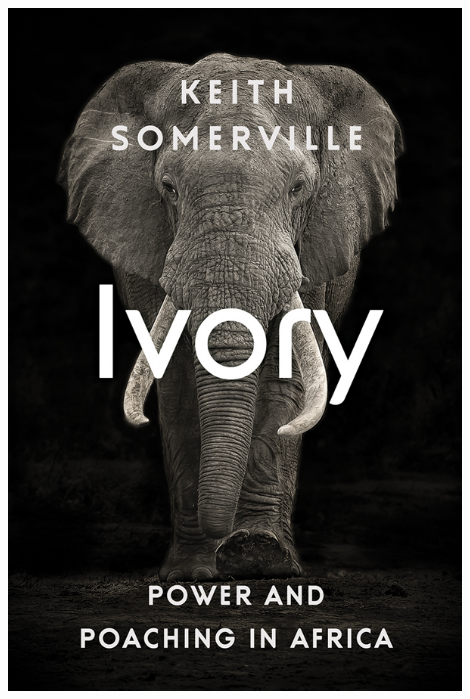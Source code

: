\documentclass[10pt]{beamer}
\begin{document}
\begin{frame}[t]
\begin{columns}
		\begin{column}{0.33\textwidth}
			\begin{center}
				\includegraphics[width=0.9\textwidth]{figures/ivory_book.jpg}
			\end{center}
		\end{column}
		

\end{columns}
\end{frame}
\end{document}

